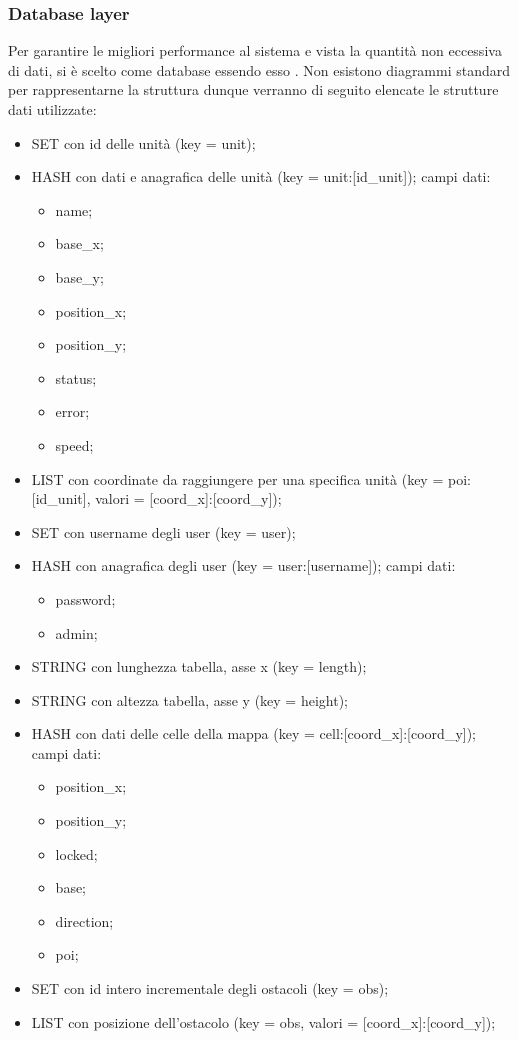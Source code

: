 	\subsubsection{Database layer}
		Per garantire le migliori performance al sistema e vista la quantità non eccessiva di dati, si è scelto  come database essendo esso . Non esistono diagrammi standard per rappresentarne la struttura dunque verranno di seguito elencate le strutture dati utilizzate:
		\begin{itemize}
			\item SET con id delle unità (key = unit);
			\item HASH con dati e anagrafica delle unità (key = unit:[id\_unit]); campi dati:
			\begin{itemize}
				\item name;
				\item base\_x;
				\item base\_y;
				\item position\_x;
				\item position\_y;
				\item status;
				\item error;
				\item speed;
			\end{itemize}
			\item LIST con coordinate  da raggiungere per una specifica unità (key = poi:[id\_unit], valori = [coord\_x]:[coord\_y]);
			\item SET con username degli user (key = user);
			\item HASH con anagrafica degli user (key = user:[username]); campi dati:
			\begin{itemize}
				\item password;
				\item admin;
			\end{itemize}
			\item STRING con lunghezza tabella, asse x (key = length);
			\item STRING con altezza tabella, asse y (key = height);
			\item HASH con dati delle celle della mappa (key = cell:[coord\_x]:[coord\_y]); campi dati:
			\begin{itemize}
				\item position\_x;
				\item position\_y;
				\item locked;
				\item base;
				\item direction;
				\item poi;
			\end{itemize}
			\item SET con id intero incrementale degli ostacoli (key = obs);
			\item LIST con posizione dell’ostacolo (key = obs, valori = [coord\_x]:[coord\_y]);
		\end{itemize}
		
